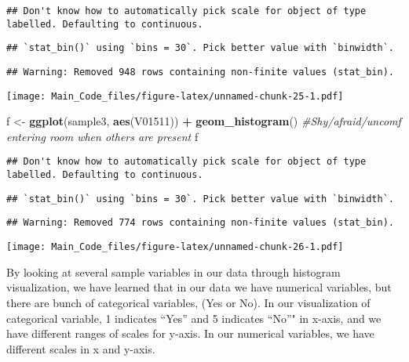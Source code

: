 \documentclass[]{article}
\newenvironment{Shaded}{\begin{snugshade}}{\end{snugshade}}
\newcommand{\KeywordTok}[1]{\textcolor[rgb]{0.13,0.29,0.53}{\textbf{#1}}}
\newcommand{\StringTok}[1]{\textcolor[rgb]{0.31,0.60,0.02}{#1}}
\newcommand{\CommentTok}[1]{\textcolor[rgb]{0.56,0.35,0.01}{\textit{#1}}}
\newcommand{\OperatorTok}[1]{\textcolor[rgb]{0.81,0.36,0.00}{\textbf{#1}}}
\newcommand{\NormalTok}[1]{#1}
\begin{document}
\begin{verbatim}
## Don't know how to automatically pick scale for object of type labelled. Defaulting to continuous.
\end{verbatim}

\begin{verbatim}
## `stat_bin()` using `bins = 30`. Pick better value with `binwidth`.
\end{verbatim}

\begin{verbatim}
## Warning: Removed 948 rows containing non-finite values (stat_bin).
\end{verbatim}

\texttt{[image: Main\_Code\_files/figure-latex/unnamed-chunk-25-1.pdf]}

\begin{Shaded}
\begin{Highlighting}[]
\NormalTok{f <-}\StringTok{ }\KeywordTok{ggplot}\NormalTok{(sample3, }\KeywordTok{aes}\NormalTok{(V01511)) }\OperatorTok{+}\StringTok{ }\KeywordTok{geom_histogram}\NormalTok{() }\CommentTok{#Shy/afraid/uncomf entering room when others are present}
\NormalTok{f}
\end{Highlighting}
\end{Shaded}

\begin{verbatim}
## Don't know how to automatically pick scale for object of type labelled. Defaulting to continuous.
\end{verbatim}

\begin{verbatim}
## `stat_bin()` using `bins = 30`. Pick better value with `binwidth`.
\end{verbatim}

\begin{verbatim}
## Warning: Removed 774 rows containing non-finite values (stat_bin).
\end{verbatim}

\texttt{[image: Main\_Code\_files/figure-latex/unnamed-chunk-26-1.pdf]}

By looking at several sample variables in our data through histogram
visualization, we have learned that in our data we have numerical
variables, but there are bunch of categorical variables, (Yes or No). In
our visualization of categorical variable, 1 indicates ``Yes'' and 5
indicates ``No''" in x-axis, and we have different ranges of scales for
y-axis. In our numerical variables, we have different scales in x and
y-axis.
\end{document}
